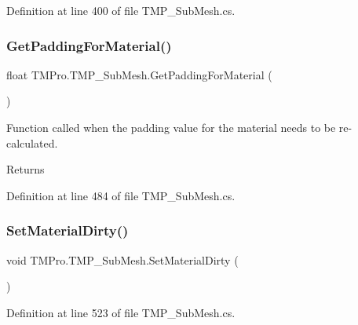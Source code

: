 Definition at line 400 of file T\+M\+P\+\_\+\+Sub\+Mesh.\+cs.

\mbox{\label{class_t_m_pro_1_1_t_m_p___sub_mesh_a9bcd237fd39eccac2018a497412504ed}} 
\subsubsection{\texorpdfstring{GetPaddingForMaterial()}{GetPaddingForMaterial()}}
{\footnotesize\ttfamily float T\+M\+Pro.\+T\+M\+P\+\_\+\+Sub\+Mesh.\+Get\+Padding\+For\+Material (\begin{DoxyParamCaption}{ }\end{DoxyParamCaption})}



Function called when the padding value for the material needs to be re-\/calculated. 

\begin{DoxyReturn}{Returns}

\end{DoxyReturn}


Definition at line 484 of file T\+M\+P\+\_\+\+Sub\+Mesh.\+cs.

\mbox{\label{class_t_m_pro_1_1_t_m_p___sub_mesh_a8df49466a47cb2d29a910fb00dfa2af5}} 
\subsubsection{\texorpdfstring{SetMaterialDirty()}{SetMaterialDirty()}}
{\footnotesize\ttfamily void T\+M\+Pro.\+T\+M\+P\+\_\+\+Sub\+Mesh.\+Set\+Material\+Dirty (\begin{DoxyParamCaption}{ }\end{DoxyParamCaption})}







Definition at line 523 of file T\+M\+P\+\_\+\+Sub\+Mesh.\+cs.

\mbox{\label{class_t_m_pro_1_1_t_m_p___sub_mesh_a130186768b0a54f84638d3b90d3f26a7}} 
